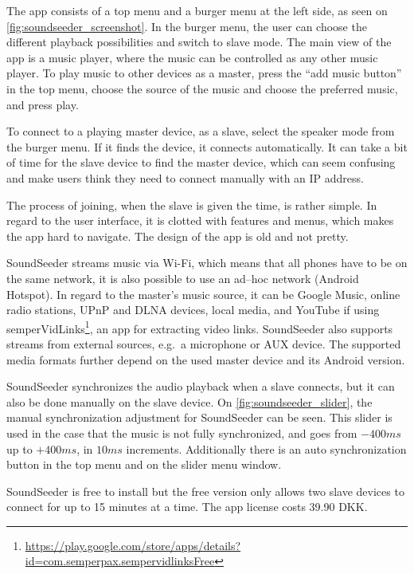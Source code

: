 The app consists of a top menu and a burger menu at the left side, as seen on \cref{fig:soundseeder_screenshot}.
In the burger menu, the user can choose the different playback possibilities and switch to slave mode.
The main view of the app is a music player, where the music can be controlled as any other music player.
To play music to other devices as a master, press the ``add music button'' in the top menu,
choose the source of the music and choose the preferred music, and press play.

To connect to a playing master device, as a slave, select the speaker mode from the burger menu.
If it finds the device, it connects automatically.
It can take a bit of time for the slave device to find the master device, which can seem confusing and make users think they need to connect manually with an IP address.

The process of joining, when the slave is given the time, is rather simple.
In regard to the user interface, it is clotted with features and menus, which makes the app hard to navigate.
The design of the app is old and not pretty.

SoundSeeder streams music via Wi-Fi,
which means that all phones have to be on the same network\cite{soundseether_faq}, it is also possible to use an ad--hoc network (Android Hotspot).
In regard to the master's music source, it can be Google Music, online radio stations, UPnP and DLNA devices, local media, and YouTube if using semperVidLinks\footnote{\url{https://play.google.com/store/apps/details?id=com.semperpax.sempervidlinksFree}}, an app for extracting video links.
SoundSeeder also supports streams from external sources, e.g.\ a microphone or AUX device.
The supported media formats further depend on the used master device and its Android version.\cite{soundseether_faq}

SoundSeeder synchronizes the audio playback when a slave connects, but it can also be done manually on the slave device.
On \cref{fig:soundseeder_slider}, the manual synchronization adjustment for SoundSeeder can be seen.
This slider is used in the case that the music is not fully synchronized, and goes from $-400 ms$ up to $+400 ms$, in $10 ms$ increments.
Additionally there is an auto synchronization button in the top menu and on the slider menu window.

SoundSeeder is free to install but the free version only allows two slave devices to connect for up to 15 minutes at a time.
The app license costs 39.90 DKK.

